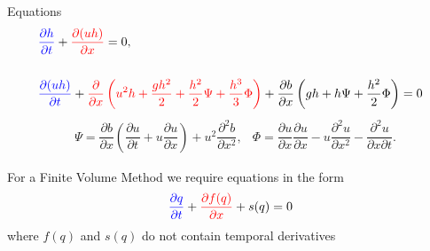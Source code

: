 \documentclass[]{beamer}
\begin{document}
\begin{frame}{Equations}
	\begin{subequations}
		\begin{align*}
		& {\color{blue}\frac{\partial h}{\partial t}} + {\color{red}\dfrac{\partial (uh)}{\partial x}} = 0,  \\ \\
		& {\color{blue}\dfrac{\partial (uh)}{\partial t}} +  {\color{red}\dfrac{\partial}{\partial x} \left ( u^2h + \dfrac{gh^2}{2} + \dfrac{h^2}{2}{\Psi } + \dfrac{h^3}{3}{ { \Phi } }  \right ) }  +  \dfrac{\partial b}{\partial x} \left (gh +   h {\Psi } + \dfrac{h^2}{2}{ {  \Phi } }  \right ) = 0
		\end{align*}
	\end{subequations}
	\begin{align*}
	&{ \Psi }  = \dfrac{\partial b}{\partial x}\left(\dfrac{\partial u}{\partial t} + u\dfrac{\partial u}{\partial x} \right)  + u^2\dfrac{\partial^2 b}{\partial x^2}, &
	{  \Phi }  = \dfrac{\partial u }{\partial x} \dfrac{\partial u}{\partial x} -u \dfrac{\partial^2 u}{\partial x^2}  - \dfrac{\partial^2 u}{\partial x \partial t} .
	\end{align*}
	
	For a Finite Volume Method we require equations in the form
	\begin{equation*}
	{\color{blue}\frac{\partial q}{\partial t}} +  {\color{red}\frac{\partial f(q)}{\partial x}} + s(q) = 0
	\end{equation*}
	where $f(q)$ and $s(q)$ do not contain temporal derivatives
\end{frame}
\end{document}
